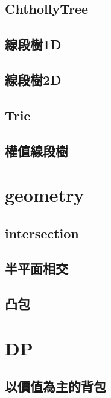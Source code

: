     \subsection{ChthollyTree}
        
    \subsection{線段樹1D}
        
    \subsection{線段樹2D}
        
    \subsection{Trie}
        
    \subsection{權值線段樹}
        
        
\section{geometry}
    \subsection{intersection}
        
    \subsection{半平面相交}
        
    \subsection{凸包}
        

\section{DP}
    \subsection{以價值為主的背包}
        
